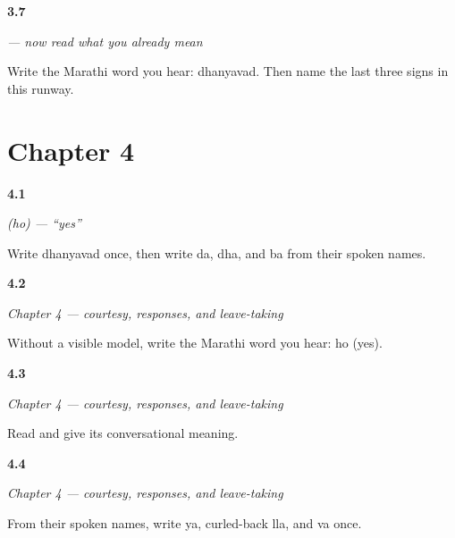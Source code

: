 \noindent\begin{minipage}[t]{\linewidth}
\raggedright
\hypertarget{review-MR-W03-dhanyavad-write-four-skills}{\textbf{3.7}} \emph{ — now read what you already mean}\par
\small Write the Marathi word you hear: dhanyavad. Then name the last three signs in this runway.
\end{minipage}\par\medskip

\section*{Chapter 4}

\noindent\begin{minipage}[t]{\linewidth}
\raggedright
\hypertarget{review-MR-C01-ho-script-r2-c}{\textbf{4.1}} \emph{ (ho) — \textquotedblleft{}yes\textquotedblright{}}\par
\small Write dhanyavad once, then write da, dha, and ba from their spoken names.
\end{minipage}\par\medskip

\noindent\begin{minipage}[t]{\linewidth}
\raggedright
\hypertarget{review-MR-C01-practice-writing-ho}{\textbf{4.2}} \emph{Chapter 4 — courtesy, responses, and leave-taking}\par
\small Without a visible model, write the Marathi word you hear: ho (yes).
\end{minipage}\par\medskip

\noindent\begin{minipage}[t]{\linewidth}
\raggedright
\hypertarget{review-MR-C01-practice-read-namaskar}{\textbf{4.3}} \emph{Chapter 4 — courtesy, responses, and leave-taking}\par
\small Read  and give its conversational meaning.
\end{minipage}\par\medskip

\noindent\begin{minipage}[t]{\linewidth}
\raggedright
\hypertarget{review-MR-C01-practice-script-r2-d}{\textbf{4.4}} \emph{Chapter 4 — courtesy, responses, and leave-taking}\par
\small From their spoken names, write ya, curled-back lla, and va once.
\end{minipage}\par\medskip

